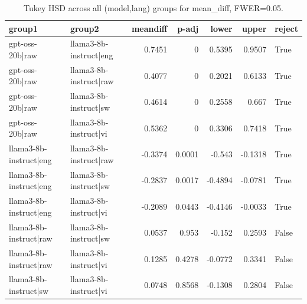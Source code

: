 \begin{table}
\caption{Tukey HSD across all (model,lang) groups for mean_diff, FWER=0.05.}
\label{tab:tukey_all_models_all_langs_mean_diff}
\begin{tabular}{l l r r r r l}
\toprule
group1 & group2 & meandiff & p-adj & lower & upper & reject \\
\midrule
gpt-oss-20b|raw & llama3-8b-instruct|eng & 0.7451 & 0 & 0.5395 & 0.9507 & True \\
gpt-oss-20b|raw & llama3-8b-instruct|raw & 0.4077 & 0 & 0.2021 & 0.6133 & True \\
gpt-oss-20b|raw & llama3-8b-instruct|sw & 0.4614 & 0 & 0.2558 & 0.667 & True \\
gpt-oss-20b|raw & llama3-8b-instruct|vi & 0.5362 & 0 & 0.3306 & 0.7418 & True \\
llama3-8b-instruct|eng & llama3-8b-instruct|raw & -0.3374 & 0.0001 & -0.543 & -0.1318 & True \\
llama3-8b-instruct|eng & llama3-8b-instruct|sw & -0.2837 & 0.0017 & -0.4894 & -0.0781 & True \\
llama3-8b-instruct|eng & llama3-8b-instruct|vi & -0.2089 & 0.0443 & -0.4146 & -0.0033 & True \\
llama3-8b-instruct|raw & llama3-8b-instruct|sw & 0.0537 & 0.953 & -0.152 & 0.2593 & False \\
llama3-8b-instruct|raw & llama3-8b-instruct|vi & 0.1285 & 0.4278 & -0.0772 & 0.3341 & False \\
llama3-8b-instruct|sw & llama3-8b-instruct|vi & 0.0748 & 0.8568 & -0.1308 & 0.2804 & False \\
\bottomrule
\end{tabular}
\end{table}
